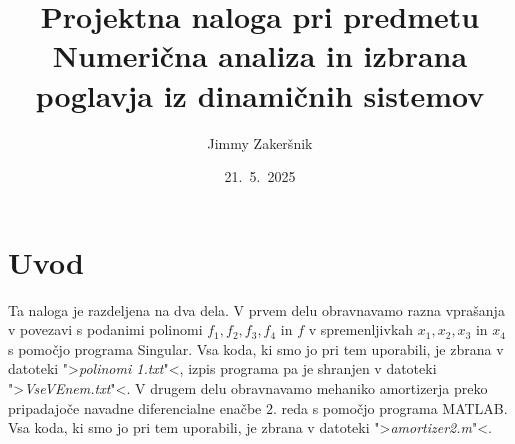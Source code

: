 \documentclass[a4paper, 10pt]{article}
\title{Projektna naloga pri predmetu Numerična analiza in izbrana poglavja iz dinamičnih sistemov}
\date{21.~5.~2025}
\author{Jimmy Zakeršnik}
\begin{document}
	\maketitle
	\thispagestyle{empty}
	\newpage
	\section{Uvod}
		Ta naloga je razdeljena na dva dela. V prvem delu obravnavamo razna vprašanja v povezavi s podanimi polinomi $f_1, f_2, f_3, f_4$ in $f$ v spremenljivkah $x_1, x_2, x_3$ in $x_4$ s pomočjo programa Singular. Vsa koda, ki smo jo pri tem uporabili, je zbrana v datoteki ">\emph{polinomi 1.txt}"<, izpis programa pa je shranjen v datoteki ">\emph{VseVEnem.txt}"<. V drugem delu obravnavamo mehaniko amortizerja preko pripadajoče navadne diferencialne enačbe $2.$ reda s pomočjo programa MATLAB. Vsa koda, ki smo jo pri tem uporabili, je zbrana v datoteki ">\emph{amortizer2.m}"<.
\end{document}
